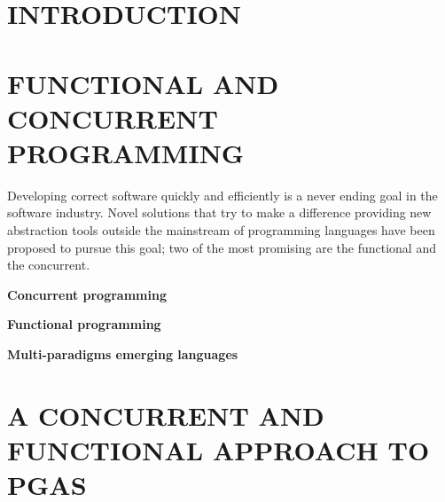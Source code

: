 \documentclass[a4paper,twoside]{article}
\newcommand{\simpleEntry}[1]{
\vspace{.3cm}
\noindent \textbf{#1}
\vspace{.3cm}
}
\begin{document}
\onecolumn \maketitle \normalsize \vfill

\section{\uppercase{Introduction}}
\label{sec:intro}
    

\section{\uppercase{Functional and concurrent programming}}
\label{sec:stateArt}
\noindent Developing correct software quickly and efficiently is a never ending goal in the software industry. Novel solutions that try to make a difference providing new abstraction tools outside the mainstream of programming languages have been proposed to pursue this goal; two of the most promising are the functional and the concurrent.





\simpleEntry{Concurrent programming}
    

\simpleEntry{Functional programming}
    

\simpleEntry{Multi-paradigms emerging languages} %
    

\section{\uppercase{A concurrent and functional approach to pGAs}}
\label{sec:design}
    
\end{document}

